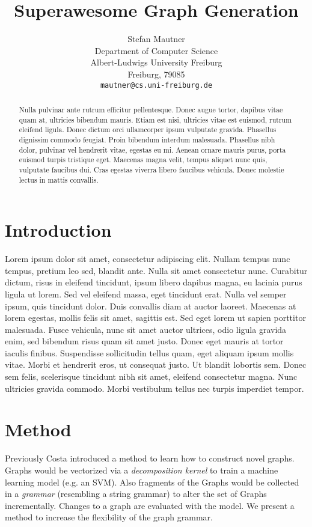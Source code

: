 \documentclass{article}
\title{Superawesome Graph Generation}
\author{
  Stefan Mautner\\
  Department of Computer Science\\
  Albert-Ludwigs University Freiburg\\
  Freiburg, 79085  \\
  \texttt{mautner@cs.uni-freiburg.de} \\
}
\begin{document}

\maketitle

\begin{abstract}
Nulla pulvinar ante rutrum efficitur pellentesque. Donec augue tortor, dapibus vitae quam at, ultricies bibendum mauris. Etiam est nisi, ultricies vitae est euismod, rutrum eleifend ligula. Donec dictum orci ullamcorper ipsum vulputate gravida. Phasellus dignissim commodo feugiat. Proin bibendum interdum malesuada. Phasellus nibh dolor, pulvinar vel hendrerit vitae, egestas eu mi. Aenean ornare mauris purus, porta euismod turpis tristique eget. Maecenas magna velit, tempus aliquet nunc quis, vulputate faucibus dui. Cras egestas viverra libero faucibus vehicula. Donec molestie lectus in mattis convallis.
\end{abstract}


\section{Introduction}

Lorem ipsum dolor sit amet, consectetur adipiscing elit. Nullam tempus nunc tempus, pretium leo sed, blandit ante. Nulla sit amet consectetur nunc. Curabitur dictum, risus in eleifend tincidunt, ipsum libero dapibus magna, eu lacinia purus ligula ut lorem. Sed vel eleifend massa, eget tincidunt erat. Nulla vel semper ipsum, quis tincidunt dolor. Duis convallis diam at auctor laoreet. Maecenas at lorem egestas, mollis felis sit amet, sagittis est. Sed eget lorem ut sapien porttitor malesuada. Fusce vehicula, nunc sit amet auctor ultrices, odio ligula gravida enim, sed bibendum risus quam sit amet justo. Donec eget mauris at tortor iaculis finibus. Suspendisse sollicitudin tellus quam, eget aliquam ipsum mollis vitae. Morbi et hendrerit eros, ut consequat justo. Ut blandit lobortis sem. Donec sem felis, scelerisque tincidunt nibh sit amet, eleifend consectetur magna. Nunc ultricies gravida commodo. Morbi vestibulum tellus nec turpis imperdiet tempor.


\section{Method}

Previously Costa introduced a method %
to learn how to construct novel graphs.
Graphs would be vectorized via a \emph{decomposition kernel}
to train a machine learning model (e.g. an SVM).
Also fragments of the Graphs would be collected in 
a \emph{grammar} (resembling a string grammar) to alter the 
set of Graphs incrementally. Changes to a graph are evaluated with the model. 
We present a method to increase the flexibility of the graph grammar.
\end{document}
